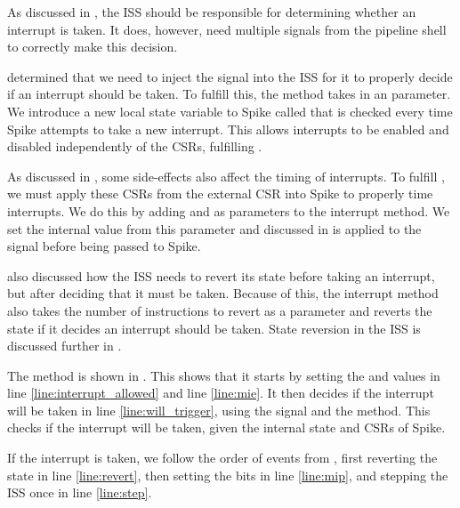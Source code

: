 As discussed in , the ISS should be responsible for determining whether an interrupt is taken. It does, however, need multiple signals from the pipeline shell to correctly make this decision.

 determined that we need to inject the  signal into the ISS for it to properly decide if an interrupt should be taken. To fulfill this, the  method takes in an  parameter. We introduce a new local state variable to Spike called  that is checked every time Spike attempts to take a new interrupt. This allows interrupts to be enabled and disabled independently of the  CSRs, fulfilling .

As discussed in , some side-effects also affect the timing of interrupts. To fulfill , we must apply these CSRs from the external CSR into Spike to properly time interrupts. We do this by adding  and  as parameters to the interrupt method. We set the internal  value from this parameter and  discussed in  is applied to the  signal before being passed to Spike.

 also discussed how the ISS needs to revert its state before taking an interrupt, but after deciding that it must be taken. Because of this, the interrupt method also takes the number of instructions to revert as a parameter and reverts the state if it decides an interrupt should be taken. State reversion in the ISS is discussed further in .


The method is shown in . This shows that it starts by setting the  and  values in line \ref{line:interrupt_allowed} and line \ref{line:mie}.
It then decides if the interrupt will be taken in line \ref{line:will_trigger}, using the  signal and the  method. This checks if the interrupt will be taken, given the internal state and CSRs of Spike.

If the interrupt is taken, we follow the order of events from , first reverting the state in line \ref{line:revert}, then setting the  bits in line \ref{line:mip}, and stepping the ISS once in line \ref{line:step}.

